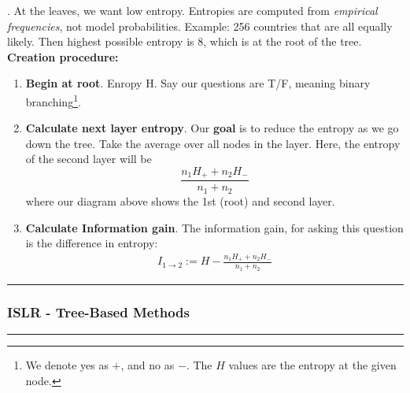 \documentclass[12pt]{article}
\newcommand{\myspace}{\vspace{2\bigskipamount}}
\newcommand\p{\Needspace{10\baselineskip} \noindent}
\begin{document}
\myspace
\p {}. At the leaves, we want low entropy. Entropies are computed from \textit{empirical frequencies}, not model probabilities. Example: 256 countries that are all equally likely. Then highest possible entropy is 8, which is at the root of the tree. \textbf{Creation procedure:}
\begin{enumerate}
\item \textbf{Begin at root}. Enropy H. Say our questions are T/F, meaning binary branching\footnote{We denote yes as $+$, and no as $-$. The $H$ values are the entropy at the given node.}.

\begin{center}
\end{center}


\item \textbf{Calculate next layer entropy}. Our \textbf{goal} is to reduce the entropy as we go down the tree. Take the average over all nodes in the layer. Here, the entropy of the second layer will be $$  \frac{n_1 H_+ + n_2 H_-}{n_1 + n_2} $$ where our diagram above shows the 1st (root) and second layer.

\item \textbf{Calculate Information gain}. The information gain, for asking this question is the difference in entropy:
\begin{align}
I_{1\rightarrow 2} := H - \frac{n_1 H_+ + n_2 H_-}{n_1 + n_2}  
\end{align}
\end{enumerate}






\myspace
{}
\hrule 
\subsubsection{ISLR - Tree-Based Methods}
\hrule 
\end{document}
